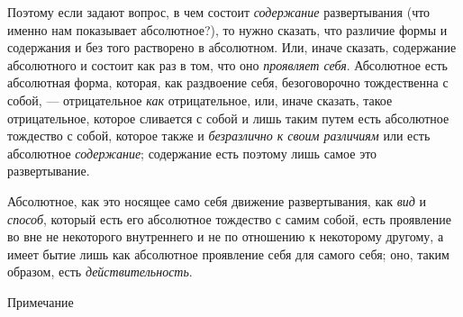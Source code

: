 Поэтому если задают вопрос, в чем состоит
{\em содержание} развертывания (что именно нам
показывает абсолютное?), то нужно сказать, что различие формы и содержания
и без того растворено в абсолютном. Или, иначе сказать, содержание
абсолютного и состоит как раз в том, что оно
{\em проявляет себя}. Абсолютное есть абсолютная форма,
которая, как раздвоение себя, безоговорочно тождественна с собой, —
отрицательное {\em как} отрицательное, или, иначе
сказать, такое отрицательное, которое сливается с собой и лишь таким путем
есть абсолютное тождество с собой, которое также и
{\em безразлично к своим различиям} или есть абсолютное
{\em содержание}; содержание есть поэтому лишь самое
это развертывание.

Абсолютное, как это носящее само себя движение развертывания, как
{\em вид} и {\em способ}, который
есть его абсолютное тождество с самим собой, есть проявление во вне не
некоторого внутреннего и не по отношению к некоторому другому, а имеет
бытие лишь как абсолютное проявление себя для самого себя; оно, таким
образом, есть {\em действительность}.

{\centering
Примечание
~
\par}

